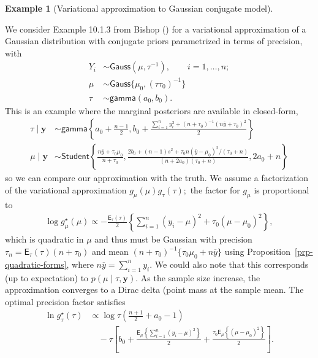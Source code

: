 \documentclass[
  11pt,
  letterpaper,
]{scrbook}
\theoremstyle{definition}
\newtheorem{example}{Example}[chapter]
\theoremstyle{plain}
\theoremstyle{plain}
\theoremstyle{plain}
\theoremstyle{definition}
\theoremstyle{definition}
\theoremstyle{plain}
\theoremstyle{plain}
\theoremstyle{remark}
\begin{document}
\begin{example}[Variational approximation to Gaussian conjugate
model]\protect\hypertarget{exm-gaussian-variational-approx}{}\label{exm-gaussian-variational-approx}

We consider Example 10.1.3 from Bishop
() for a variational approximation of a
Gaussian distribution with conjugate priors parametrized in terms of
precision, with \begin{align*}
Y_i &\sim \mathsf{Gauss}(\mu, \tau^{-1}), \qquad i =1, \ldots, n;\\
\mu &\sim \mathsf{Gauss}\{\mu_0, (\tau\tau_0)^{-1}\} \\
\tau &\sim \mathsf{gamma}(a_0, b_0).
\end{align*} This is an example where the marginal posteriors are
available in closed-form, \begin{align*}
\tau \mid \boldsymbol{y} &\sim \mathsf{gamma}\left\{ a_0 + \frac{n-1}{2}, b_0 + \frac{\sum_{i=1}^n y_i^2 + (n+\tau_0)^{-1}(n\overline{y}+\tau_0)^2}{2}\right\} 
\\ \mu \mid \boldsymbol{y} &\sim \mathsf{Student}\left\{ \frac{n\overline{y}+\tau_0\mu_0}{n+\tau_0}, \frac{2b_0 +(n-1)s^2 + \tau_0n(\overline{y}-\mu_0)^2/(\tau_0+n)}{(n+2a_0)(\tau_0+n)}, 2a_0+n\right\}
\end{align*} so we can compare our approximation with the truth. We
assume a factorization of the variational approximation
\(g_\mu(\mu)g_\tau(\tau);\) the factor for \(g_\mu\) is proportional to
\begin{align*}
 \log g^{\star}_{\mu}(\mu) \propto -\frac{\mathsf{E}_{\tau}(\tau)}{2} \left\{ \sum_{i=1}^n (y_i-\mu)^2 + \tau_0(\mu-\mu_0)^2\right\},
\end{align*} which is quadratic in \(\mu\) and thus must be Gaussian
with precision \(\tau_n = \mathsf{E}_{\tau}(\tau)(n + \tau_0)\) and mean
\((n + \tau_0)^{-1}\{\tau_0\mu_0 + n\overline{y}\}\) using
Proposition~\ref{prp-quadratic-forms}, where
\(n\overline{y} = \sum_{i=1}^n y_i.\) We could also note that this
corresponds (up to expectation) to \(p(\mu \mid \tau, \boldsymbol{y}).\)
As the sample size increase, the approximation converges to a Dirac
delta (point mass at the sample mean. The optimal precision factor
satisfies \begin{align*}
 \ln g^{\star}_{\tau}(\tau) &\propto \log \tau\left(\frac{n+1}{2} + a_0-1\right)   \\&\quad- \tau \left[b_0  + \frac{\mathsf{E}_{\mu}\left\{\sum_{i=1}^n (y_i-\mu)^2\right\}}{2}  + \frac{\tau_0\mathsf{E}_{\mu}\left\{(\mu-\mu_0)^2\right\}}{2}\right].

\end{align*}
\end{example}
\end{document}
